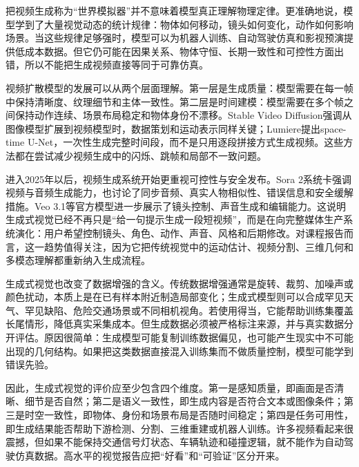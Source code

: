 \documentclass[UTF8,a4paper,12pt]{ctexart}
\newcommand{\model}[1]{\textsf{#1}}
\begin{document}
把视频生成称为“世界模拟器”并不意味着模型真正理解物理定律。更准确地说，模型学到了大量视觉动态的统计规律：物体如何移动，镜头如何变化，动作如何影响场景。当这些规律足够强时，模型可以为机器人训练、自动驾驶仿真和影视预演提供低成本数据。但它仍可能在因果关系、物体守恒、长期一致性和可控性方面出错，所以不能把生成视频直接等同于可靠仿真。

视频扩散模型的发展可以从两个层面理解。第一层是生成质量：模型需要在每一帧中保持清晰度、纹理细节和主体一致性。第二层是时间建模：模型需要在多个帧之间保持动作连续、场景布局稳定和物体身份不漂移。\model{Stable Video Diffusion}强调从图像模型扩展到视频模型时，数据策划和运动表示同样关键\cite{svd}；\model{Lumiere}提出space-time U-Net，一次性生成完整时间段，而不是只用逐段拼接方式生成视频\cite{lumiere}。这些方法都在尝试减少视频生成中的闪烁、跳帧和局部不一致问题。

进入2025年以后，视频生成系统开始更重视可控性与安全发布。\model{Sora 2}系统卡强调视频与音频生成能力，也讨论了同步音频、真实人物相似性、错误信息和安全缓解措施\cite{sora2}。\model{Veo 3.1}等官方模型进一步展示了镜头控制、声音生成和编辑能力\cite{veo}。这说明生成式视觉已经不再只是“给一句提示生成一段短视频”，而是在向完整媒体生产系统演化：用户希望控制镜头、角色、动作、声音、风格和后期修改。对课程报告而言，这一趋势值得关注，因为它把传统视觉中的运动估计、视频分割、三维几何和多模态理解都重新纳入生成流程。

生成式视觉也改变了数据增强的含义。传统数据增强通常是旋转、裁剪、加噪声或颜色扰动，本质上是在已有样本附近制造局部变化；生成式模型则可以合成罕见天气、罕见缺陷、危险交通场景或不同相机视角。若使用得当，它能帮助训练集覆盖长尾情形，降低真实采集成本。但生成数据必须被严格标注来源，并与真实数据分开评估。原因很简单：生成模型可能复制训练数据偏见，也可能产生现实中不可能出现的几何结构。如果把这类数据直接混入训练集而不做质量控制，模型可能学到错误先验。

因此，生成式视觉的评价应至少包含四个维度。第一是感知质量，即画面是否清晰、细节是否自然；第二是语义一致性，即生成内容是否符合文本或图像条件；第三是时空一致性，即物体、身份和场景布局是否随时间稳定；第四是任务可用性，即生成结果能否帮助下游检测、分割、三维重建或机器人训练。许多视频看起来很震撼，但如果不能保持交通信号灯状态、车辆轨迹和碰撞逻辑，就不能作为自动驾驶仿真数据。高水平的视觉报告应把“好看”和“可验证”区分开来。
\end{document}
